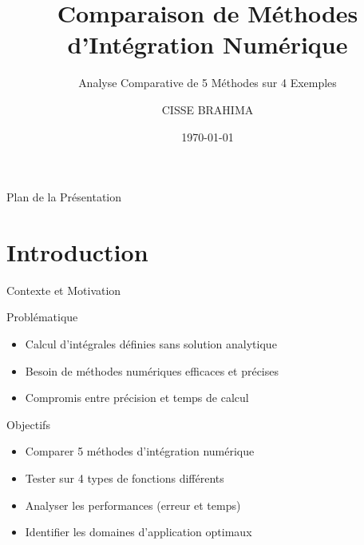 \documentclass[aspectratio=169,11pt]{beamer}
\title[Intégration Numérique]{Comparaison de Méthodes d'Intégration Numérique}
\subtitle{Analyse Comparative de 5 Méthodes sur 4 Exemples}
\author{CISSE BRAHIMA}
\institute{L'UNIVERSITÉ NANGUI ABROGOUA (UNA)}
\date{\today}
\begin{document}
\begin{frame}
\titlepage
\end{frame}

\begin{frame}{Plan de la Présentation}
\tableofcontents
\end{frame}

\section{Introduction}

\begin{frame}{Contexte et Motivation}
\vspace{-0.2cm}
\begin{block}{Problématique}
\small
\begin{itemize}
\item Calcul d'intégrales définies sans solution analytique
\item Besoin de méthodes numériques efficaces et précises
\item Compromis entre précision et temps de calcul
\end{itemize}
\end{block}

\vspace{-0.1cm}
\begin{block}{Objectifs}
\small
\begin{itemize}
\item Comparer 5 méthodes d'intégration numérique
\item Tester sur 4 types de fonctions différents
\item Analyser les performances (erreur et temps)
\item Identifier les domaines d'application optimaux
\end{itemize}
\end{block}
\end{frame}
\end{document}
